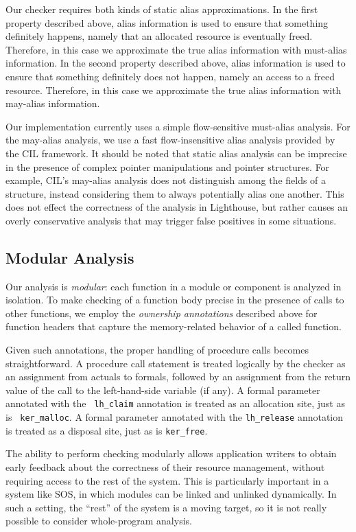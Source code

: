 Our checker requires both kinds of static alias approximations.  In
the first property described above, alias information is used to
ensure that something definitely happens, namely that an allocated
resource is eventually freed.  Therefore, in this case we approximate
the true alias information with must-alias information.  In the second
property described above, alias information is used to ensure that
something definitely does not happen, namely an access to a freed
resource.  Therefore, in this case we approximate the true alias
information with may-alias information.

Our implementation currently uses a simple flow-sensitive must-alias
analysis.  For the may-alias analysis, we use a fast flow-insensitive
alias analysis provided by the CIL framework.  It should be noted that 
static alias analysis
can be imprecise in the presence of complex pointer
manipulations and pointer structures.  For example, CIL's may-alias
analysis does not distinguish among the fields of a structure, instead
considering them to always potentially alias one another.  This does not
effect the correctness of the analysis in Lighthouse, but rather causes an overly 
conservative analysis that may trigger false positives in some situations.

\subsection{Modular Analysis}

Our analysis is {\em modular}:  each function in a module or component
is analyzed in isolation.  To make checking of a function body precise
in the presence of calls to other functions, we employ the {\em ownership
annotations} described above for function headers that capture the memory-related
behavior of a called function.


Given such annotations, the proper handling of procedure calls becomes
straightforward.  A procedure call statement is treated logically by
the checker as an assignment from actuals to formals, followed by an
assignment from the return value of the call to the left-hand-side
variable (if any).  A formal parameter annotated with the {\tt
lh\_claim} annotation is treated as an allocation site, just as is {\tt
ker\_malloc}.  A formal parameter annotated with the {\tt lh\_release}
annotation is treated as a disposal site, just as is {\tt ker\_free}.

The ability to perform checking modularly allows application writers
to obtain early feedback about the correctness of their resource
management, without requiring access to the rest of the system.  This
is particularly important in a system like SOS, in which modules can
be linked and unlinked dynamically.  In such a setting, the ``rest''
of the system is a moving target, so it is not really possible to
consider whole-program analysis.


